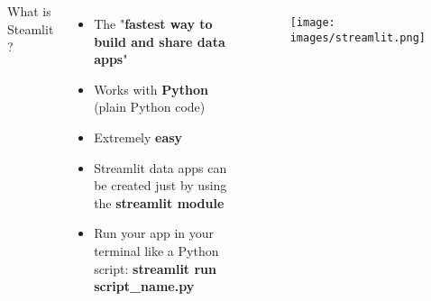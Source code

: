 \documentclass{beamer}[10pt, usepdftitle=false handout]
\begin{document}
\begin{frame}


\begin{columns}[c]

What is Steamlit ?
\vspace*{0.6em}

\begin{itemize}
\item{The "\textbf{fastest way to build and share data apps}"}
\item{Works with \textbf{Python} (plain Python code)}
\item{Extremely \textbf{easy}}
\item{Streamlit data apps can be created just by using the \textbf{streamlit module}}
\item{Run your app in your terminal like a Python script: \textbf{streamlit run script\_name.py}}
\end{itemize}


\begin{figure}
\texttt{[image: images/streamlit.png]} 
\end{figure}	

\end{columns}

\end{frame}
\end{document}
